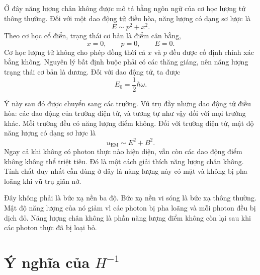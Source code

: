 Ở đây năng lượng chân không được mô tả bằng ngôn ngữ của cơ học lượng tử thông thường. Đối với một dao động tử điều hòa, năng lượng có dạng sơ lược là
\begin{equation}
E\sim p^2+x^2.
\end{equation}
Theo cơ học cổ điển, trạng thái cơ bản là điểm cân bằng,
\begin{equation}
x=0,\qquad p=0,\qquad E=0.
\end{equation}
Cơ học lượng tử không cho phép đồng thời cả \(x\) và \(p\) đều được cố định chính xác bằng không. Nguyên lý bất định buộc phải có các thăng giáng, nên năng lượng trạng thái cơ bản là dương. Đối với dao động tử, ta được
\begin{equation}
E_0=\frac{1}{2}\hbar\omega.
\end{equation}

Ý này sau đó được chuyển sang các trường. Vũ trụ đầy những dao động tử điều hòa: các dao động của trường điện từ, và tương tự như vậy đối với mọi trường khác. Mỗi trường đều có năng lượng điểm không. Đối với trường điện từ, mật độ năng lượng có dạng sơ lược là
\begin{equation}
u_{\mathrm{EM}}\sim E^2+B^2.
\end{equation}
Ngay cả khi không có photon thực nào hiện diện, vẫn còn các dao động điểm không không thể triệt tiêu. Đó là một cách giải thích năng lượng chân không. Tính chất duy nhất cần dùng ở đây là năng lượng này có mặt và không bị pha loãng khi vũ trụ giãn nở.

\begin{classroomqa}
\end{classroomqa}

Đây không phải là bức xạ nền ba độ. Bức xạ nền vi sóng là bức xạ thông thường. Mật độ năng lượng của nó giảm vì các photon bị pha loãng và mỗi photon đều bị dịch đỏ. Năng lượng chân không là phần năng lượng điểm không còn lại sau khi các photon thực đã bị loại bỏ.

\section{Ý nghĩa của \(H^{-1}\)}

